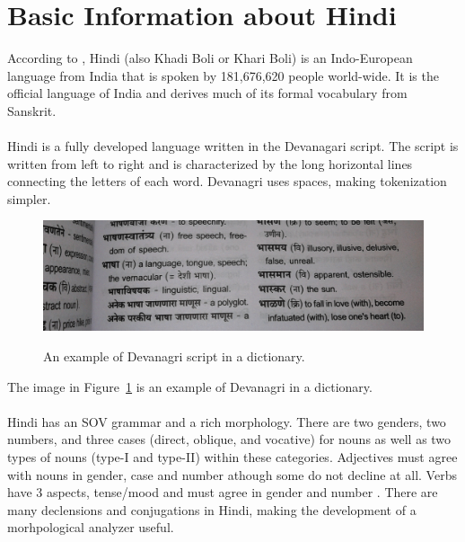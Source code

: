 \documentclass[11pt,letterpaper]{article}
\begin{document}
\section{Basic Information about Hindi}
According to \cite{ethnologue}, Hindi (also Khadi Boli or Khari Boli) is an Indo-European language from India that is spoken by 181,676,620 people world-wide. It is the official language of India and derives much of its formal vocabulary from Sanskrit. \\
\\
Hindi is a fully developed language written in the Devanagari script. The script is written from left to right and is characterized by the long horizontal lines connecting the letters of each word. Devanagri uses spaces, making tokenization simpler.
\begin{figure}[h]
  \caption{An example of Devanagri script in a dictionary.}
  \centering
  \includegraphics[scale=0.15]{devanagri.jpg}
  \label{script}
\end{figure}
The image in Figure~\ref{script} is an example of Devanagri in a dictionary. \\
\\
Hindi has an SOV grammar and a rich morphology. There are two genders, two numbers, and three cases (direct, oblique, and vocative) for nouns as well as two types of nouns (type-I and type-II) within these categories. Adjectives must agree with nouns in gender, case and number athough some do not decline at all. Verbs have 3 aspects, tense/mood and must agree in gender and number \cite{snell}. There are many declensions and conjugations in Hindi, making the development of a morhpological analyzer useful.
\end{document}
